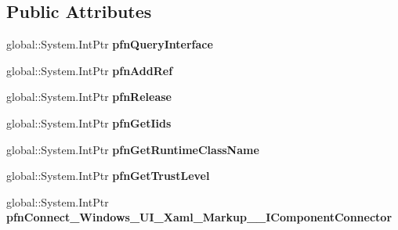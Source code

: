\subsection*{Public Attributes}
\begin{DoxyCompactItemize}
\item 
\mbox{\label{struct_windows_1_1_u_i_1_1_xaml_1_1_markup_1_1_i_component_connector_____impl_1_1_vtbl_a4950d2056f4dfe4ec3245fbaf3743f90}} 
global\+::\+System.\+Int\+Ptr {\bfseries pfn\+Query\+Interface}
\item 
\mbox{\label{struct_windows_1_1_u_i_1_1_xaml_1_1_markup_1_1_i_component_connector_____impl_1_1_vtbl_a9aac0e3cf3581679d66dcb945017d54a}} 
global\+::\+System.\+Int\+Ptr {\bfseries pfn\+Add\+Ref}
\item 
\mbox{\label{struct_windows_1_1_u_i_1_1_xaml_1_1_markup_1_1_i_component_connector_____impl_1_1_vtbl_a4366f283aec31a778bb584056d01708d}} 
global\+::\+System.\+Int\+Ptr {\bfseries pfn\+Release}
\item 
\mbox{\label{struct_windows_1_1_u_i_1_1_xaml_1_1_markup_1_1_i_component_connector_____impl_1_1_vtbl_ab5eb04dfcf253148638aba8874dde009}} 
global\+::\+System.\+Int\+Ptr {\bfseries pfn\+Get\+Iids}
\item 
\mbox{\label{struct_windows_1_1_u_i_1_1_xaml_1_1_markup_1_1_i_component_connector_____impl_1_1_vtbl_a8118b8220691af4bbd0f9e4ae79bb386}} 
global\+::\+System.\+Int\+Ptr {\bfseries pfn\+Get\+Runtime\+Class\+Name}
\item 
\mbox{\label{struct_windows_1_1_u_i_1_1_xaml_1_1_markup_1_1_i_component_connector_____impl_1_1_vtbl_a3ffaec3fea9332b694b155e5c4f86298}} 
global\+::\+System.\+Int\+Ptr {\bfseries pfn\+Get\+Trust\+Level}
\item 
\mbox{\label{struct_windows_1_1_u_i_1_1_xaml_1_1_markup_1_1_i_component_connector_____impl_1_1_vtbl_a40641e9097361e50ec18a385ee8e9f96}} 
global\+::\+System.\+Int\+Ptr {\bfseries pfn\+Connect\+\_\+\+Windows\+\_\+\+U\+I\+\_\+\+Xaml\+\_\+\+Markup\+\_\+\+\_\+\+I\+Component\+Connector}
\end{DoxyCompactItemize}
